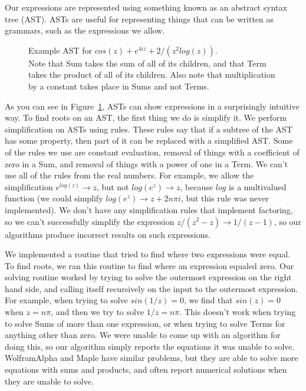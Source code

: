 Our expressions are represented using something known as an abstract syntax tree (AST). ASTs are useful for representing things that can be written as grammars, such as the expressions we allow.
\begin{figure}[H]
	
	\caption{Example AST for $cos(z)+e^{4iz}+2/(z^2log(z))$. \\ Note that Sum takes the sum of all of its children, and that Term takes the product of all of its children. Also note that multiplication by a constant takes place in Sums and not Terms. }
	\label{fig:astExample}
\end{figure}
\noindent As you can see in Figure~\ref{fig:astExample}, ASTs can show expressions in a surprisingly intuitive way. To find roots on an AST, the first thing we do is simplify it. We perform simplification on ASTs using rules. These rules say that if a subtree of the AST has some property, then part of it can be replaced with a simplified AST. Some of the rules we use are constant evaluation, removal of things with a coefficient of zero in a Sum, and removal of things with a power of one in a Term. We can't use all of the rules from the real numbers. For example, we allow the simplification $e^{log(z)}\to z$, but not $log(e^z)\to z$, because $log$ is a multivalued function (we could simplify $log(e^z)\to z+2n\pi i$, but this rule was never implemented). We don't have any simplification rules that implement factoring, so we can't successfully simplify the expression $z/(z^2-z)\to 1/(z-1)$, so our algorithms produce incorrect results on such expressions.

We implemented a routine that tried to find where two expressions were equal. To find roots, we ran this routine to find where an expression equaled zero. Our solving routine worked by trying to solve the outermost expression on the right hand side, and calling itself recursively on the input to the outermost expression. For example, when trying to solve $sin(1/z)=0$, we find that $sin(z)=0$ when $z=n\pi$, and then we try to solve $1/z=n\pi$. This doesn't work when trying to solve Sums of more than one expression, or when trying to solve Terms for anything other than zero. We were unable to come up with an algorithm for doing this, so our algorithm simply reports the equations it was unable to solve. WolframAlpha and Maple have similar problems, but they are able to solve more equations with sums and products, and often report numerical solutions when they are unable to solve.
